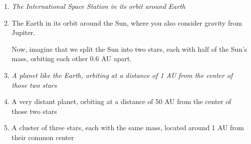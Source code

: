 \documentclass[11pt]{article}
\begin{document}
\begin{enumerate}
	
	\item \it The International Space Station in its orbit around Earth
	\vspace{2in}
	\item The Earth in its orbit around the Sun, where you also consider gravity from Jupiter.
	
		\vspace{2in}


\newpage
\rm	Now, imagine that we split the Sun into two stars, each with half of the Sun's mass, orbiting each other 0.6 AU apart.

	\item \it A planet like the Earth, orbiting at a distance of 1 AU from the center of those two stars
		\vspace{2.5in}
	\item A very distant planet, orbiting at a distance of 50 AU from the center of those two stars
		\vspace{2.5in}
	\item A cluster of three stars, each with the same mass, located around 1 AU from their common center

\end{enumerate}
\end{document}
